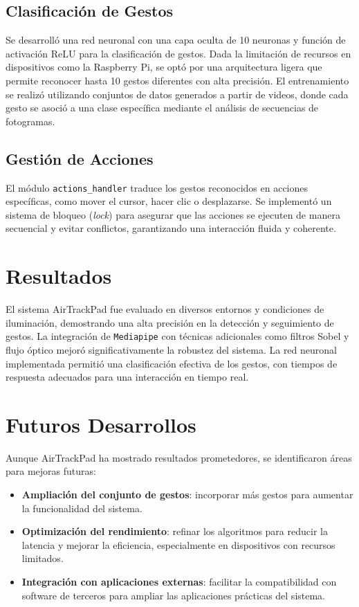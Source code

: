 \documentclass[a4paper,12pt]{article}
\begin{document}
{\subsection{Clasificación de Gestos}
Se desarrolló una red neuronal con una capa oculta de 10 neuronas y función de activación ReLU para la clasificación de gestos. Dada la limitación de recursos en dispositivos como la Raspberry Pi, se optó por una arquitectura ligera que permite reconocer hasta 10 gestos diferentes con alta precisión. El entrenamiento se realizó utilizando conjuntos de datos generados a partir de videos, donde cada gesto se asoció a una clase específica mediante el análisis de secuencias de fotogramas.

\subsection{Gestión de Acciones}
El módulo \texttt{actions\_handler} traduce los gestos reconocidos en acciones específicas, como mover el cursor, hacer clic o desplazarse. Se implementó un sistema de bloqueo (\textit{lock}) para asegurar que las acciones se ejecuten de manera secuencial y evitar conflictos, garantizando una interacción fluida y coherente.

\section{Resultados}
El sistema AirTrackPad fue evaluado en diversos entornos y condiciones de iluminación, demostrando una alta precisión en la detección y seguimiento de gestos. La integración de \texttt{Mediapipe} con técnicas adicionales como filtros Sobel y flujo óptico mejoró significativamente la robustez del sistema. La red neuronal implementada permitió una clasificación efectiva de los gestos, con tiempos de respuesta adecuados para una interacción en tiempo real.

\section{Futuros Desarrollos}
Aunque AirTrackPad ha mostrado resultados prometedores, se identificaron áreas para mejoras futuras:

\begin{itemize}
    \item \textbf{Ampliación del conjunto de gestos}: incorporar más gestos para aumentar la funcionalidad del sistema.
    \item \textbf{Optimización del rendimiento}: refinar los algoritmos para reducir la latencia y mejorar la eficiencia, especialmente en dispositivos con recursos limitados.
    \item \textbf{Integración con aplicaciones externas}: facilitar la compatibilidad con software de terceros para ampliar las aplicaciones prácticas del sistema.
\end{itemize}

}
\end{document}
